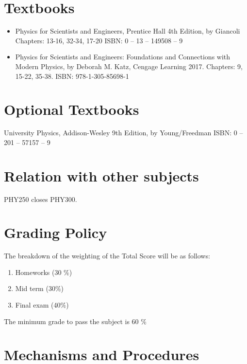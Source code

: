 \documentclass[12pt]{article}
\begin{document}

\section*{Textbooks}

\begin{itemize}
\item 
Physics for Scientists and Engineers, Prentice Hall 4th Edition, by Giancoli 
		Chapters:  13-16, 32-34, 17-20  
		ISBN: 0 – 13 – 149508 – 9 
\item Physics for Scientists and Engineers: Foundations and Connections with Modern Physics,
		by Deborah M. Katz, Cengage Learning 2017.  
		Chapters:  9, 15-22, 35-38. 
		ISBN: 978-1-305-85698-1
\end{itemize}

\section*{Optional Textbooks}

University Physics, Addison-Wesley 9th Edition, by Young/Freedman
			ISBN: 0 – 201 – 57157 – 9 

\section*{Relation with other subjects}

PHY250 closes PHY300. 

\section*{Grading Policy}

The breakdown of the weighting of the Total Score will be as follows:

\begin{enumerate}
\item  	Homeworks (30 $\%$)
\item   Mid term (30$\%$)
\item 	Final exam (40$\%$)

\end{enumerate}

The minimum grade to pass the subject is 60 \% 


\section*{Mechanisms and Procedures}
\end{document}
